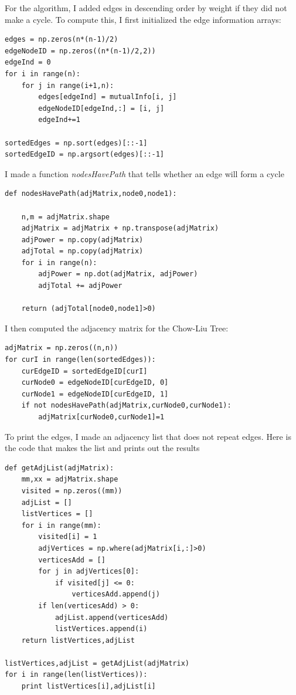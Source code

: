 \documentclass[twoside,11pt]{article}
\theoremstyle{definition}
\begin{document}
For the algorithm, I added edges in descending order by weight if they did not make a cycle. To compute this, I first initialized the edge information arrays:
\begin{lstlisting}
edges = np.zeros(n*(n-1)/2)
edgeNodeID = np.zeros((n*(n-1)/2,2))
edgeInd = 0
for i in range(n):
    for j in range(i+1,n):
        edges[edgeInd] = mutualInfo[i, j]
        edgeNodeID[edgeInd,:] = [i, j]
        edgeInd+=1

sortedEdges = np.sort(edges)[::-1]
sortedEdgeID = np.argsort(edges)[::-1]
\end{lstlisting}

I made a function \textit{nodesHavePath} that tells whether an edge will form a cycle
\begin{lstlisting}
def nodesHavePath(adjMatrix,node0,node1):

    n,m = adjMatrix.shape
    adjMatrix = adjMatrix + np.transpose(adjMatrix)
    adjPower = np.copy(adjMatrix)
    adjTotal = np.copy(adjMatrix)
    for i in range(n):
        adjPower = np.dot(adjMatrix, adjPower)
        adjTotal += adjPower

    return (adjTotal[node0,node1]>0)
\end{lstlisting}

I then computed the adjacency matrix for the Chow-Liu Tree:
\begin{lstlisting}
adjMatrix = np.zeros((n,n))
for curI in range(len(sortedEdges)):
    curEdgeID = sortedEdgeID[curI]
    curNode0 = edgeNodeID[curEdgeID, 0]
    curNode1 = edgeNodeID[curEdgeID, 1]
    if not nodesHavePath(adjMatrix,curNode0,curNode1):
        adjMatrix[curNode0,curNode1]=1
\end{lstlisting}

\newpage

To print the edges, I made an adjacency list that does not repeat edges. Here is the code that makes the list and prints out the results
\begin{lstlisting}
def getAdjList(adjMatrix):
    mm,xx = adjMatrix.shape
    visited = np.zeros((mm))
    adjList = []
    listVertices = []
    for i in range(mm):
        visited[i] = 1
        adjVertices = np.where(adjMatrix[i,:]>0)
        verticesAdd = []
        for j in adjVertices[0]:
            if visited[j] <= 0:
                verticesAdd.append(j)
        if len(verticesAdd) > 0:
            adjList.append(verticesAdd)
            listVertices.append(i)
    return listVertices,adjList

listVertices,adjList = getAdjList(adjMatrix)
for i in range(len(listVertices)):
    print listVertices[i],adjList[i]
\end{lstlisting}
\end{document}
